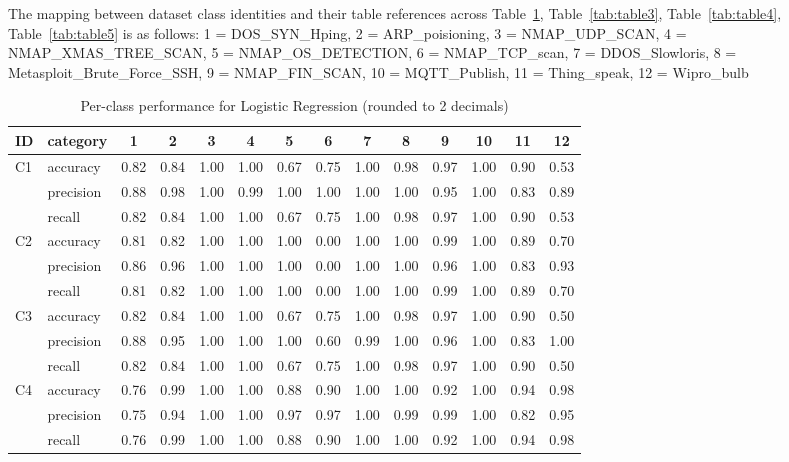 \documentclass[11pt]{article}
\begin{document}
The mapping between dataset class identities and their table references across Table~\ref{tab:table2}, Table~\ref{tab:table3}, Table~\ref{tab:table4}, Table~\ref{tab:table5} is as follows:
1 = DOS\_SYN\_Hping, 2 = ARP\_poisioning, 3 = NMAP\_UDP\_SCAN, 4 = NMAP\_XMAS\_TREE\_SCAN, 5 = NMAP\_OS\_DETECTION, 
6 = NMAP\_TCP\_scan, 7 = DDOS\_Slowloris, 8 = Metasploit\_Brute\_Force\_SSH, 9 = NMAP\_FIN\_SCAN, 10 = MQTT\_Publish, 11 = Thing\_speak, 12 = Wipro\_bulb

\begin{table} [h]
  \centering
  \begin{tabular}{llcccccccccccc}
      \toprule
      ID & category & 1 & 2 & 3 & 4 & 5 & 6 & 7 & 8 & 9 & 10 & 11 & 12 \\
      \midrule

      \multirow{3}{*}{C1}
        & accuracy  & 0.82 & 0.84 & 1.00 & 1.00 & 0.67 & 0.75 & 1.00 & 0.98 & 0.97 & 1.00 & 0.90 & 0.53 \\
        & precision & 0.88 & 0.98 & 1.00 & 0.99 & 1.00 & 1.00 & 1.00 & 1.00 & 0.95 & 1.00 & 0.83 & 0.89 \\
        & recall    & 0.82 & 0.84 & 1.00 & 1.00 & 0.67 & 0.75 & 1.00 & 0.98 & 0.97 & 1.00 & 0.90 & 0.53 \\
      \midrule

      \multirow{3}{*}{C2}
        & accuracy  & 0.81 & 0.82 & 1.00 & 1.00 & 1.00 & 0.00 & 1.00 & 1.00 & 0.99 & 1.00 & 0.89 & 0.70 \\
        & precision & 0.86 & 0.96 & 1.00 & 1.00 & 1.00 & 0.00 & 1.00 & 1.00 & 0.96 & 1.00 & 0.83 & 0.93 \\
        & recall    & 0.81 & 0.82 & 1.00 & 1.00 & 1.00 & 0.00 & 1.00 & 1.00 & 0.99 & 1.00 & 0.89 & 0.70 \\
      \midrule

      \multirow{3}{*}{C3}
        & accuracy  & 0.82 & 0.84 & 1.00 & 1.00 & 0.67 & 0.75 & 1.00 & 0.98 & 0.97 & 1.00 & 0.90 & 0.50 \\
        & precision & 0.88 & 0.95 & 1.00 & 1.00 & 1.00 & 0.60 & 0.99 & 1.00 & 0.96 & 1.00 & 0.83 & 1.00 \\
        & recall    & 0.82 & 0.84 & 1.00 & 1.00 & 0.67 & 0.75 & 1.00 & 0.98 & 0.97 & 1.00 & 0.90 & 0.50 \\
      \midrule

      \multirow{3}{*}{C4}
        & accuracy  & 0.76 & 0.99 & 1.00 & 1.00 & 0.88 & 0.90 & 1.00 & 1.00 & 0.92 & 1.00 & 0.94 & 0.98 \\
        & precision & 0.75 & 0.94 & 1.00 & 1.00 & 0.97 & 0.97 & 1.00 & 0.99 & 0.99 & 1.00 & 0.82 & 0.95 \\
        & recall    & 0.76 & 0.99 & 1.00 & 1.00 & 0.88 & 0.90 & 1.00 & 1.00 & 0.92 & 1.00 & 0.94 & 0.98 \\
  \bottomrule
  \end{tabular}
  \caption{Per-class performance for Logistic Regression (rounded to 2 decimals)}
  \label{tab:table2}
\end{table}
\end{document}
